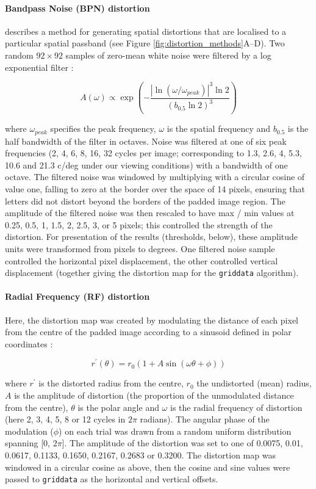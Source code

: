 \documentclass[doc, 11pt,a4paper,natbib]{apa6}\usepackage[]{graphicx}\usepackage[]{color}
\begin{document}
\paragraph{Bandpass Noise (BPN) distortion} \citet[][see also \citep{rovamo_detection_1997, wiecek_metamorphopsia_2014}]{bex_sensitivity_2010} describes a method for generating spatial distortions that are localised to a particular spatial passband (see Figure \ref{fig:distortion_methods}A--D).
Two random $92 \times 92$ samples of zero-mean white noise were filtered by a log exponential filter \citep[see Equation 1 in][]{bex_sensitivity_2010}:

$$
A(\omega) \propto \exp \left( - \frac{|\ln (\omega / \omega_{peak})|^3 \ln 2}{(b_{0.5} \ln2)^3} \right)
$$

where $\omega_{peak}$ specifies the peak frequency, $\omega$  is the spatial frequency and $b_{0.5}$ is the half bandwidth of the filter in octaves.
Noise was filtered at one of six peak frequencies (2, 4, 6, 8, 16, 32 cycles per image; corresponding to 1.3, 2.6, 4, 5.3, 10.6 and 21.3 c/deg under our viewing conditions) with a bandwidth of one octave.
The filtered noise was windowed by multiplying with a circular cosine of value one, falling to zero at the border over the space of 14 pixels, ensuring that letters did not distort beyond the borders of the padded image region.
The amplitude of the filtered noise was then rescaled to have max / min values at 0.25, 0.5, 1, 1.5, 2, 2.5, 3, or 5 pixels; this controlled the strength of the distortion.
For presentation of the results (thresholds, below), these amplitude units were transformed from pixels to degrees.
One filtered noise sample controlled the horizontal pixel displacement, the other controlled vertical displacement (together giving the distortion map for the \texttt{griddata} algorithm).

\paragraph{Radial Frequency (RF) distortion} Here, the distortion map was created by modulating the distance of each pixel from the centre of the padded image according to a sinusoid defined in polar coordinates \citep[see Equation 3 in][and \ref{fig:distortion_methods}E--G]{wilkinson_detection_1998}:

$$
r^\prime(\theta) = r_0 (1 + A \sin (\omega \theta + \phi))
$$

where $r^\prime$ is the distorted radius from the centre, $r_0$ the undistorted (mean) radius, $A$ is the amplitude of distortion (the proportion of the unmodulated distance from the centre), $\theta$ is the polar angle and $\omega$ is the radial frequency of distortion (here 2, 3, 4, 5, 8 or 12 cycles in $2\pi$ radians).
The angular phase of the modulation ($\phi$) on each trial was drawn from a random uniform distribution spanning [0, $2\pi$].
The amplitude of the distortion was set to one of 0.0075, 0.01, 0.0617, 0.1133, 0.1650, 0.2167, 0.2683 or 0.3200.
The distortion map was windowed in a circular cosine as above, then the cosine and sine values were passed to \texttt{griddata} as the horizontal and vertical offsets.
\end{document}
